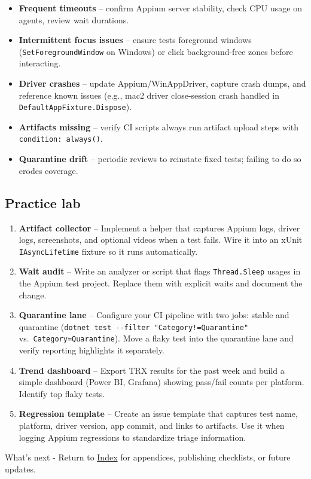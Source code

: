 \begin{itemize}
\tightlist
\item
  \textbf{Frequent timeouts} -- confirm Appium server stability, check
  CPU usage on agents, review wait durations.
\item
  \textbf{Intermittent focus issues} -- ensure tests foreground windows
  (\passthrough{\lstinline!SetForegroundWindow!} on Windows) or click
  background-free zones before interacting.
\item
  \textbf{Driver crashes} -- update Appium/WinAppDriver, capture crash
  dumps, and reference known issues (e.g., mac2 driver close-session
  crash handled in \passthrough{\lstinline!DefaultAppFixture.Dispose!}).
\item
  \textbf{Artifacts missing} -- verify CI scripts always run artifact
  upload steps with \passthrough{\lstinline!condition: always()!}.
\item
  \textbf{Quarantine drift} -- periodic reviews to reinstate fixed
  tests; failing to do so erodes coverage.
\end{itemize}

\subsection{Practice lab}\label{practice-lab-14}

\begin{enumerate}
\def\labelenumi{\arabic{enumi}.}
\tightlist
\item
  \textbf{Artifact collector} -- Implement a helper that captures Appium
  logs, driver logs, screenshots, and optional videos when a test fails.
  Wire it into an xUnit \passthrough{\lstinline!IAsyncLifetime!} fixture
  so it runs automatically.
\item
  \textbf{Wait audit} -- Write an analyzer or script that flags
  \passthrough{\lstinline!Thread.Sleep!} usages in the Appium test
  project. Replace them with explicit waits and document the change.
\item
  \textbf{Quarantine lane} -- Configure your CI pipeline with two jobs:
  stable and quarantine
  (\passthrough{\lstinline'dotnet test --filter "Category!=Quarantine"'}
  vs.~\passthrough{\lstinline!Category=Quarantine!}). Move a flaky test
  into the quarantine lane and verify reporting highlights it
  separately.
\item
  \textbf{Trend dashboard} -- Export TRX results for the past week and
  build a simple dashboard (Power BI, Grafana) showing pass/fail counts
  per platform. Identify top flaky tests.
\item
  \textbf{Regression template} -- Create an issue template that captures
  test name, platform, driver version, app commit, and links to
  artifacts. Use it when logging Appium regressions to standardize
  triage information.
\end{enumerate}

What's next - Return to \href{../Index.md}{Index} for appendices,
publishing checklists, or future updates.
